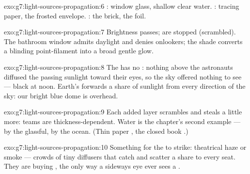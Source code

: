 \begin{solution}{exo:g7:light-sources-propagation:6}
: window glass, shallow clear water. :
tracing paper, the frosted envelope. : the brick, the foil.
\end{solution}

\begin{solution}{exo:g7:light-sources-propagation:7}
Brightness passes;  are stopped (scrambled). The bathroom
window admits daylight and denies onlookers; the shade converts a
blinding point-filament into a broad gentle glow.
\end{solution}

\begin{solution}{exo:g7:light-sources-propagation:8}
The  has no : nothing above the astronauts diffused the
passing sunlight toward their eyes, so the sky offered nothing to
see --- black at noon. Earth's  forwards a share of sunlight
from every direction of the sky: our bright blue dome is
 overhead.
\end{solution}

\begin{solution}{exo:g7:light-sources-propagation:9}
Each added layer scrambles and steals a little more: teams are
thickness-dependent. Water is the chapter's second example ---
 by the glassful,  by the ocean. (Thin paper
, the closed book .)
\end{solution}

\begin{solution}{exo:g7:light-sources-propagation:10}
Something for the  to strike: theatrical haze or smoke ---
crowds of tiny diffusers that catch  and scatter a
share to every seat. They are buying , the only way a
sideways eye ever sees a .
\end{solution}

